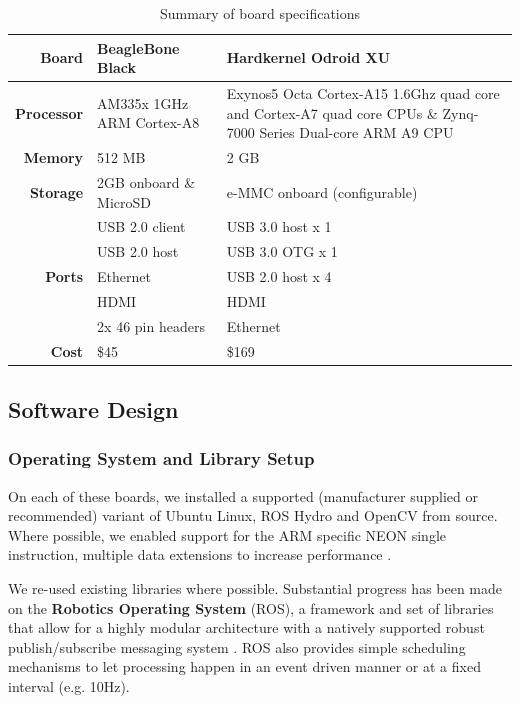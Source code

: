 \documentclass{acm_proc_article-sp}
\begin{document}
\begin{table}[t]
  \centering
  \caption{Summary of board specifications}
    \begin{tabular}{r p{5.5cm} p{5.5cm} }
    \toprule
    \textbf{Board} & \textbf{BeagleBone Black} & \textbf{Hardkernel Odroid XU} \\
    \midrule
    \textbf{Processor} & AM335x 1GHz ARM Cortex-A8 & Exynos5 Octa Cortex-A15 1.6Ghz quad core and Cortex-A7 quad core CPUs \& Zynq-7000 Series Dual-core ARM A9 CPU  \\
    \textbf{Memory} & 512 MB & 2 GB  \\
    \textbf{Storage} & 2GB onboard \& MicroSD & e-MMC onboard (configurable) \\
    \multirow{5}[0]{*}{\textbf{Ports}} & USB 2.0 client & USB 3.0 host x 1 \\
          & USB 2.0 host & USB 3.0 OTG x 1  \\
          & Ethernet & USB 2.0 host x 4  \\
          & HDMI  & HDMI   \\
          & 2x 46 pin headers & Ethernet \\
    \textbf{Cost} & \$45 & \$169  \\
    \bottomrule
    \end{tabular}%
  \label{tab:board-specs}%
\end{table}%


\subsection{Software Design}

\subsubsection{Operating System and Library Setup\label{sec:roscopter}}
On each of these boards, we installed a supported (manufacturer supplied or recommended) variant of Ubuntu Linux, ROS Hydro and OpenCV from source. Where possible, we enabled support for the ARM specific NEON single instruction, multiple data  extensions to increase performance \cite{stotzer2013openmp}.

We re-used existing libraries where possible. Substantial progress has been made on the \textbf{Robotics Operating System} (ROS), a framework and set of libraries that allow for a highly modular architecture with a natively supported robust publish/subscribe messaging system \cite{quigley2009ros}.  ROS also provides simple scheduling mechanisms to let processing happen in an event driven manner or at a fixed interval (e.g. 10Hz).
\end{document}
